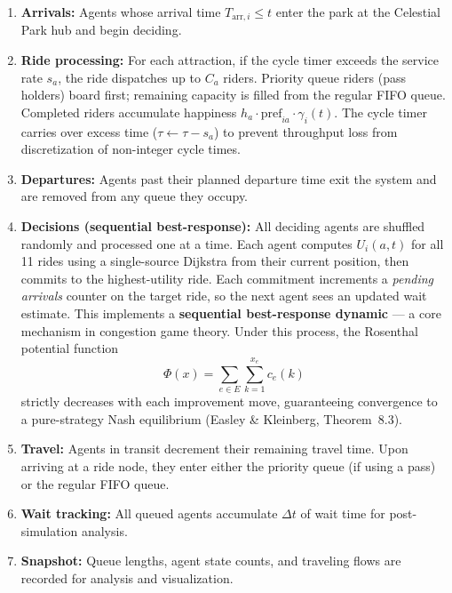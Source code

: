 \documentclass[11pt]{article}
\begin{document}
\begin{enumerate}[nosep]
    \item \textbf{Arrivals:} Agents whose arrival time $T_{\text{arr},i} \leq t$ enter the park at the Celestial Park hub and begin deciding.

    \item \textbf{Ride processing:} For each attraction, if the cycle timer exceeds the service rate $s_a$, the ride dispatches up to $C_a$ riders. Priority queue riders (pass holders) board first; remaining capacity is filled from the regular FIFO queue. Completed riders accumulate happiness $h_a \cdot \text{pref}_{ia} \cdot \gamma_i(t)$. The cycle timer carries over excess time ($\tau \leftarrow \tau - s_a$) to prevent throughput loss from discretization of non-integer cycle times.

    \item \textbf{Departures:} Agents past their planned departure time exit the system and are removed from any queue they occupy.

    \item \textbf{Decisions (sequential best-response):} All deciding agents are shuffled randomly and processed one at a time. Each agent computes $U_i(a, t)$ for all 11 rides using a single-source Dijkstra from their current position, then commits to the highest-utility ride. Each commitment increments a \emph{pending arrivals} counter on the target ride, so the next agent sees an updated wait estimate. This implements a \textbf{sequential best-response dynamic} --- a core mechanism in congestion game theory. Under this process, the Rosenthal potential function
    \[
    \Phi(x) = \sum_{e \in E} \sum_{k=1}^{x_e} c_e(k)
    \]
    strictly decreases with each improvement move, guaranteeing convergence to a pure-strategy Nash equilibrium (Easley \& Kleinberg, Theorem~8.3).

    \item \textbf{Travel:} Agents in transit decrement their remaining travel time. Upon arriving at a ride node, they enter either the priority queue (if using a pass) or the regular FIFO queue.

    \item \textbf{Wait tracking:} All queued agents accumulate $\Delta t$ of wait time for post-simulation analysis.

    \item \textbf{Snapshot:} Queue lengths, agent state counts, and traveling flows are recorded for analysis and visualization.
\end{enumerate}
\end{document}
